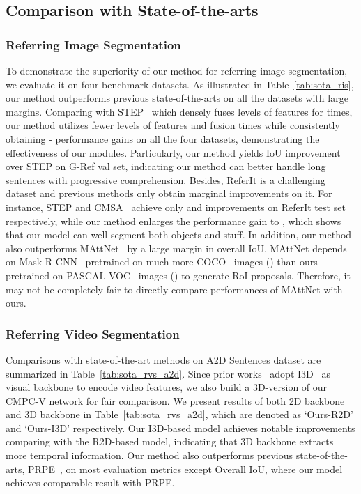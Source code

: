 \documentclass[10pt,journal,cspaper,compsoc]{IEEEtran}
\begin{document}
\subsection{Comparison with State-of-the-arts}
\subsubsection{Referring Image Segmentation}
To demonstrate the superiority of our method for referring image segmentation, we evaluate it on four benchmark datasets. 
As illustrated in Table~\ref{tab:sota_ris}, our method outperforms previous state-of-the-arts on all the datasets with large margins. 
Comparing with STEP~\cite{chen2019see} which densely fuses  levels of features for  times, our method utilizes fewer levels of features and fusion times while consistently obtaining - performance gains on all the four datasets, demonstrating the effectiveness of our modules. 
Particularly, our method yields  IoU improvement over STEP on G-Ref val set, indicating our method can better handle long sentences with progressive comprehension. 
Besides, ReferIt is a challenging dataset and previous methods only obtain marginal improvements on it. 
For instance, STEP and CMSA~\cite{ye2019cross} achieve only  and  improvements on ReferIt test set respectively, while our method enlarges the performance gain to , which shows that our model can well segment both objects and stuff.
In addition, our method also outperforms MAttNet~\cite{yu2018mattnet} by a large margin in overall IoU. 
MAttNet depends on Mask R-CNN~\cite{he2017mask} pretrained on much more COCO~\cite{lin2014microsoft} images () than ours pretrained on PASCAL-VOC~\cite{everingham2010pascal} images () to generate RoI proposals. 
Therefore, it may not be completely fair to directly compare performances of MAttNet with ours.

\subsubsection{Referring Video Segmentation}
Comparisons with state-of-the-art methods on A2D Sentences dataset are summarized in Table~\ref{tab:sota_rvs_a2d}.
Since prior works~\cite{gavrilyuk2018actor, wang2019asymmetric, ning2020polar} adopt I3D~\cite{carreira2017quo} as visual backbone to encode video features, we also build a 3D-version of our CMPC-V network for fair comparison.
We present results of both 2D backbone and 3D backbone in Table~\ref{tab:sota_rvs_a2d}, which are denoted as `Ours-R2D' and `Ours-I3D' respectively. 
Our I3D-based model achieves notable improvements comparing with the R2D-based model, indicating that 3D backbone extracts more temporal information. 
Our method also outperforms previous state-of-the-arts, PRPE~\cite{ning2020polar},
on most evaluation metrics except Overall IoU, where our model achieves comparable result with PRPE.
\end{document}
